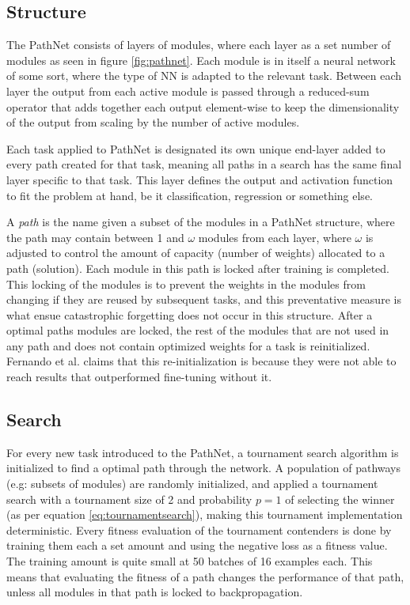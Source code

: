 \subsection{Structure}
The PathNet consists of layers of modules, where each layer as a set number of modules as seen in figure \ref{fig:pathnet}. Each module is in itself a neural network of some sort, where the type of NN is adapted to the relevant task. Between each layer the output from each active module is passed through a reduced-sum operator that adds together each output element-wise to keep the dimensionality of the output from scaling by the number of active modules. 

Each task applied to PathNet is designated its own unique end-layer added to every path created for that task, meaning all paths in a search has the same final layer specific to that task. This layer defines the output and activation function to fit the problem at hand, be it classification, regression or something else.  

A \textit{path} is the name given a subset of the modules in a PathNet structure, where the path may contain between 1 and \(\omega\) modules from each layer, where \(\omega\) is adjusted to control the amount of capacity (number of weights) allocated to a path (solution). Each module in this path is locked after training is completed. This locking of the modules is to prevent the weights in the modules from changing if they are reused by subsequent tasks, and this preventative measure is what ensue catastrophic forgetting does not occur in this structure. After a optimal paths modules are locked, the rest of the modules that are not used in any path and does not contain optimized weights for a task is reinitialized. Fernando et al. claims\cite{pathnet} that this re-initialization is because they were not able to reach results that outperformed fine-tuning without it.

\subsection{Search}
For every new task introduced to the PathNet, a tournament search algorithm is initialized to find a optimal path through the network. A population of pathways (e.g: subsets of modules) are randomly initialized, and applied a tournament search with a tournament size of 2 and probability \(p=1\) of selecting the winner (as per equation \ref{eq:tournamentsearch}), making this tournament implementation deterministic. Every fitness evaluation of the tournament contenders is done by training them each a set amount and using the negative loss as a fitness value. The training amount is quite small at 50 batches of 16 examples each. This means that evaluating the fitness of a path changes the performance of that path, unless all modules in that path is locked to backpropagation.

